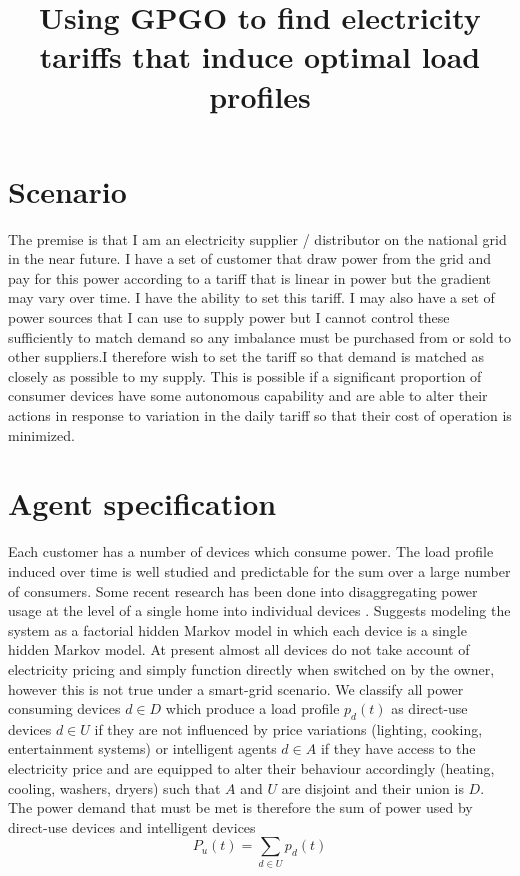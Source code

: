 \documentclass[11pt]{article}
\title{\textbf{Using GPGO to find electricity tariffs that
induce optimal load profiles
}}
\author{}
\date{}
\begin{document}
\maketitle


\section{Scenario}

The premise is that I am an electricity supplier / distributor on the national grid
in the near future. I have a set of customer that draw power from the grid and
pay for this power according to a tariff that is linear in power but the gradient
may vary over time. I have the ability to set this tariff. I may also have a
set of power sources that I can use to supply power but I cannot control these
sufficiently to match demand so any imbalance must be purchased from or sold to other suppliers.I therefore wish to set the tariff so that demand is matched as closely as possible to my supply. This is possible if a significant
proportion of consumer devices have some autonomous capability and are able
to alter their actions in response to variation in the daily tariff so that their cost
of operation is minimized.

\section{Agent specification}
Each customer has a number of devices which consume power. The load profile induced over time is well studied and predictable for the sum over a large number of consumers. Some recent research has been done into disaggregating power usage at the level of a single home into individual devices \cite{kolter2011redd} \cite{anderson2012blued}. \cite{kolter2011redd} Suggests modeling the system as a factorial hidden Markov model in which each device is a single hidden Markov model. At present almost all devices do not take account of electricity pricing and simply function directly when switched on by the owner, however this is not true under a smart-grid scenario. We classify all power consuming devices $d \in D$ which produce a load profile $p_{d}(t)$ as direct-use devices $d \in U$ if they are not influenced by price variations (lighting, cooking, entertainment systems) or intelligent agents $d \in A$ if they have access to the electricity price and are equipped to alter their behaviour accordingly (heating, cooling, washers, dryers) such that $A$ and $U$ are disjoint and their union is $D$. The power demand that must be met is therefore the sum of power used by direct-use devices and intelligent devices
\begin{equation}
P_{u} (t) = \sum_{d \in U} p_{d} (t)
\end{equation}
\end{document}
